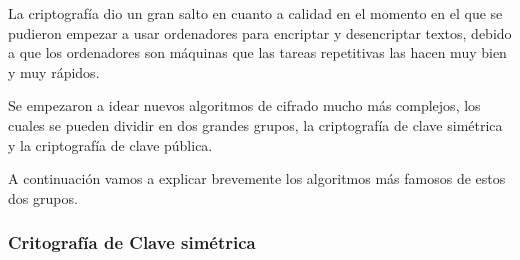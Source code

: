 La criptografía dio un gran salto en cuanto a calidad en el momento en el que se pudieron empezar a usar ordenadores para encriptar y desencriptar textos, debido a que los ordenadores son máquinas que las tareas repetitivas las hacen muy bien y muy rápidos.

Se empezaron a idear nuevos algoritmos de cifrado mucho más complejos, los cuales se pueden dividir en dos grandes grupos, la criptografía de clave simétrica y la criptografía de clave pública.

A continuación vamos a explicar brevemente los algoritmos más famosos de estos dos grupos.

\subsubsection*{Critografía de Clave simétrica}
	
